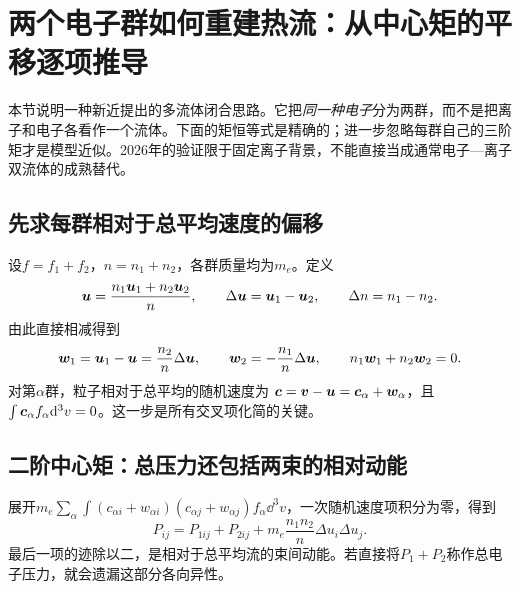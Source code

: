 \documentclass[UTF8,a4paper,11pt,openany,fontset=fandol]{ctexbook}
\begin{document}
\section{两个电子群如何重建热流：从中心矩的平移逐项推导}
本节说明一种新近提出的多流体闭合思路。它把\emph{同一种电子}分为两群，而不是把离子和电子各看作一个流体。下面的矩恒等式是精确的；进一步忽略每群自己的三阶矩才是模型近似。2026年的验证限于固定离子背景，不能直接当成通常电子—离子双流体的成熟替代。\citep{F635}

\subsection{先求每群相对于总平均速度的偏移}
设$f=f_1+f_2$，$n=n_1+n_2$，各群质量均为$m_e$。定义
\begin{equation}
 \bm{u}=\frac{n_1\bm{u}_1+n_2\bm{u}_2}{n},\qquad
 \Delta\bm{u}=\bm{u}_1-\bm{u}_2,\qquad \Delta n=n_1-n_2.
\end{equation}
由此直接相减得到
\begin{equation}
 \bm{w}_1=\bm{u}_1-\bm{u}=\frac{n_2}{n}\Delta\bm{u},
 \qquad \bm{w}_2=-\frac{n_1}{n}\Delta\bm{u},
 \qquad n_1\bm{w}_1+n_2\bm{w}_2=0.
\end{equation}
对第$\alpha$群，粒子相对于总平均的随机速度为
$\bm{c}=\bm{v}-\bm{u}=\bm{c}_\alpha+\bm{w}_\alpha$，且
$\int\bm{c}_\alpha f_\alpha\mathrm d^3v=0$。这一步是所有交叉项化简的关键。

\subsection{二阶中心矩：总压力还包括两束的相对动能}
展开$m_e\sum_\alpha\int(c_{\alpha i}+w_{\alpha i})
(c_{\alpha j}+w_{\alpha j})f_\alpha\dd^3v$，一次随机速度项积分为零，得到
\begin{equation}
 P_{ij}=P_{1ij}+P_{2ij}
 +m_e\frac{n_1n_2}{n}\Delta u_i\Delta u_j.
 \label{eq:mixture_pressure}
\end{equation}
最后一项的迹除以二，是相对于总平均流的束间动能。若直接将$P_1+P_2$称作总电子压力，就会遗漏这部分各向异性。
\end{document}

